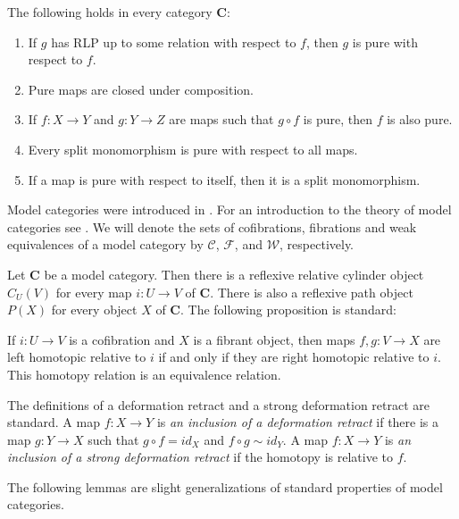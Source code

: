 \documentclass{tac}
\theoremstyle{definition}
\newcommand{\we}{\mathcal{W}}
\newcommand{\fib}{\mathcal{F}}
\newcommand{\cof}{\mathcal{C}}
\newcommand{\cat}[1]{\mathbf{#1}}
\newcommand{\C}{\cat{C}}
\begin{document}
\begin{prop}
The following holds in every category $\C$:
\begin{enumerate}
\item If $g$ has RLP up to some relation with respect to $f$, then $g$ is pure with respect to $f$.
\item Pure maps are closed under composition.
\item If $f : X \to Y$ and $g : Y \to Z$ are maps such that $g \circ f$ is pure, then $f$ is also pure.
\item Every split monomorphism is pure with respect to all maps.
\item If a map is pure with respect to itself, then it is a split monomorphism.
\end{enumerate}
\end{prop}

Model categories were introduced in \cite{quillen}.
For an introduction to the theory of model categories see \cite{hirschhorn,hovey}.
We will denote the sets of cofibrations, fibrations and weak equivalences of a model category by $\cof$, $\fib$, and $\we$, respectively.

Let $\C$ be a model category.
Then there is a reflexive relative cylinder object $C_U(V)$ for every map $i : U \to V$ of $\C$.
There is also a reflexive path object $P(X)$ for every object $X$ of $\C$.
The following proposition is standard:
\begin{prop}
If $i : U \to V$ is a cofibration and $X$ is a fibrant object, then maps $f,g : V \to X$ are left homotopic relative to $i$ if and only if they are right homotopic relative to $i$.
This homotopy relation is an equivalence relation.
\end{prop}

The definitions of a deformation retract and a strong deformation retract are standard.
A map $f : X \to Y$ is \emph{an inclusion of a deformation retract} if there is
a map $g : Y \to X$ such that $g \circ f = id_X$ and $f \circ g \sim id_Y$.
A map $f : X \to Y$ is \emph{an inclusion of a strong deformation retract} if the homotopy is relative to $f$.

The following lemmas are slight generalizations of standard properties of model categories.
\end{document}
